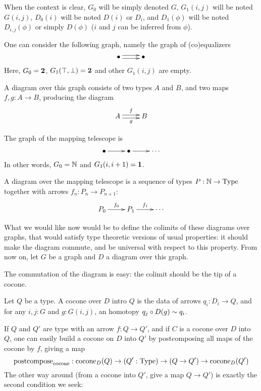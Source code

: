 When the context is clear, $G_0$ will be simply denoted $G$,
$G_1(i,j)$ will be noted $G(i,j)$, $D_0(i)$
will be noted $D(i)$ or $D_i$, and $D_1(\phi)$ will be noted
$D_{i,j}(\phi)$ or simply $D(\phi)$ ($i$ and $j$ can be inferred from
$\phi$).

\begin{exms}
  \item One can consider the following graph, namely the graph of
    (co)equalizers
    \[ \xymatrix{\bullet \ar@<-.5ex>[r] \ar@<.5ex>[r] & \bullet} \]
    Here, $G_0 = \mathbf{2}$, $G_1(\top,\bot) = \mathbf{2}$ and other
    $G_1(i,j)$ are empty.

    A diagram over this graph consists of two types $A$ and $B$, and
    two maps $f,g:A \to B$, producing the diagram
    \[ \xymatrix{A \ar@<-.5ex>[r]_g \ar@<.5ex>[r]^f & B} \]
  \item The graph of the mapping telescope is 
    \[ \xymatrix{ \bullet \ar[r] &\bullet \ar[r] &\cdots} \]
    In other words, $G_0=\mathbb{N}$ and $G_1(i,i+1) = \mathbf{1}$.

    A diagram over the mapping telescope is a sequence of types $P:\mathbb{N}
    \to \operatorname{Type}$ together with arrows $f_n:P_n \to P_{n+1}$:
    \[ \xymatrix{ P_0 \ar[r]^{f_0} & P_1 \ar[r]^{f_1} & \cdots} \]
\end{exms}

What we would like now would be to define the colimits of these
diagrams over graphs, that would satisfy type theoretic versions of
usual properties: it should make the diagram commute, and be universal
with respect to this property.
From now on, let $G$ be a graph and $D$ a diagram over this graph.

The commutation of the diagram is easy: the colimit should be the tip
of a cocone.

\begin{defi}[Cocone]\label{defi:cocone}
  Let $Q$ be a type. A cocone over $D$ intro $Q$ is the data of arrows
  $q_i:D_i \to Q$, and for any $i,j:G$ and $g:G(i,j)$, an homotopy 
  $q_j \circ D(g) \sim q_i$.
\end{defi}

If $Q$ and $Q'$ are type with an arrow $f:Q\to Q'$, and if $C$ is a
cocone over $D$ into $Q$, one can easily build a cocone on $D$ into
$Q'$ by postcomposing all maps of the cocone by $f$, giving a map
\newcommand{\postcomposecocone}{\mathrm{postcompose}_{\mathrm{cocone}}}
\[\postcomposecocone : \cocone_D(Q) \to (Q':\Type) \to (Q \to Q') \to \cocone_D(Q') \]
The other way around (from a cocone into $Q'$, give a map $Q\to Q'$)
is exactly the second condition we seek:

